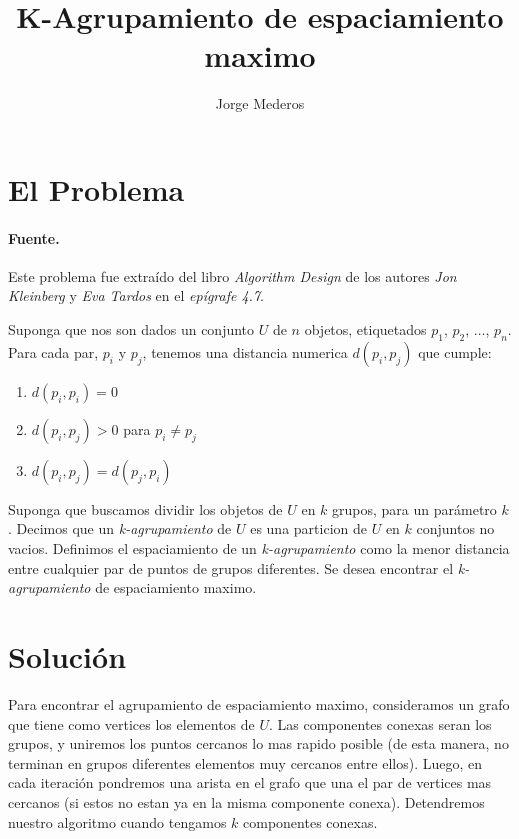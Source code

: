\documentclass[spanish]{llncs}
\begin{document}
\title{K-Agrupamiento de espaciamiento maximo}

\author{Jorge Mederos}


\maketitle

\section{El Problema}

\paragraph*{Fuente.} Este problema fue extraído del libro \emph{Algorithm Design}
de los autores \emph{Jon Kleinberg} y \emph{Eva Tardos} en el \emph{epígrafe 4.7}.

Suponga que nos son dados un conjunto $U$ de $n$ objetos, etiquetados
$p_1$, $p_2$, $\dots$, $p_n$. Para cada par, $p_i$ y $p_j$, tenemos una
distancia numerica $d(p_i,p_j)$ que cumple:
\begin{enumerate}
	\item $d(p_i,p_i) = 0$
	\item $d(p_i,p_j)>0$ para $p_i \neq p_j$
	\item $d(p_i,p_j) = d(p_j,p_i)$
\end{enumerate}

Suponga que buscamos dividir los objetos de $U$ en $k$ grupos, para
un parámetro $k$. Decimos que un \emph{k-agrupamiento} de $U$ es una particion
de $U$ en $k$ conjuntos no vacios. Definimos el espaciamiento de un
\emph{k-agrupamiento} como la menor distancia entre cualquier par de puntos
de grupos diferentes. Se desea encontrar el \emph{k-agrupamiento} de espaciamiento
maximo.

\section{Solución}

Para encontrar el agrupamiento de espaciamiento maximo, consideramos un grafo
que tiene como vertices los elementos de $U$. Las componentes conexas seran los
grupos, y uniremos los puntos cercanos lo mas rapido posible (de esta manera,
no terminan en grupos diferentes elementos muy cercanos entre ellos). Luego,
en cada iteración pondremos una arista en el grafo que una el par de vertices
mas cercanos (si estos no estan ya en la misma componente conexa). Detendremos
nuestro algoritmo cuando tengamos $k$ componentes conexas.
\end{document}

